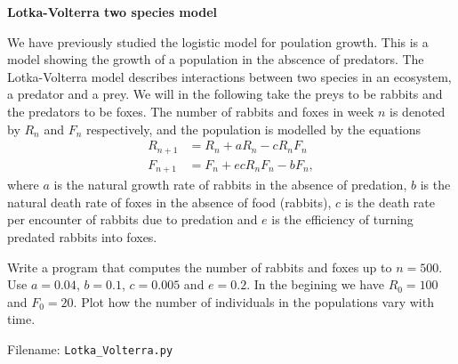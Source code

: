 \begin{Problem}{\textbf{Lotka-Volterra two species model}}

\noindent We have previously studied the logistic model for poulation growth. This is a
model showing the growth of a population in the abscence of predators. The
Lotka-Volterra model describes interactions between two species in an ecosystem,
a predator and a prey. We will in the following take the preys to be rabbits and the
predators to be foxes. The number of rabbits and foxes in week $n$ is denoted by
$R_n$ and $F_n$ respectively, and the population is modelled by the equations
\begin{align*}
R_{n+1} &= R_n + aR_n - cR_nF_n\\
F_{n+1} &= F_n + ecR_nF_n - bF_n,
\end{align*}
where $a$ is the natural growth rate of rabbits in the absence of predation, $b$ is
the natural death rate of foxes in the absence of food (rabbits), $c$ is the death
rate per encounter of rabbits due to predation and $e$ is the efficiency of turning
predated rabbits into foxes.

Write a program that computes the number of rabbits and foxes up to $n = 500$.
Use $a = 0.04$, $b = 0.1$, $c = 0.005$ and $e = 0.2$. In the begining we have
$R_0 = 100$ and $F_0 = 20$. Plot how the number of individuals in the populations
vary with time.

Filename: \texttt{Lotka\_Volterra.py}
\end{Problem}

